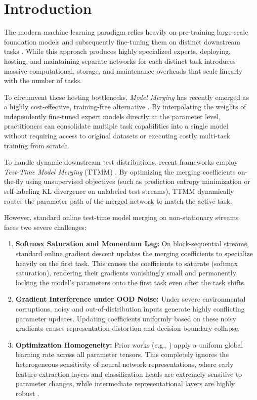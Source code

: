 \documentclass{article}
\theoremstyle{plain}
\theoremstyle{definition}
\theoremstyle{remark}
\begin{document}
\section{Introduction}
\label{submission_intro}
The modern machine learning paradigm relies heavily on pre-training large-scale foundation models and subsequently fine-tuning them on distinct downstream tasks \cite{resnet, wortsman_soups_2022}. While this approach produces highly specialized experts, deploying, hosting, and maintaining separate networks for each distinct task introduces massive computational, storage, and maintenance overheads that scale linearly with the number of tasks. 

To circumvent these hosting bottlenecks, \emph{Model Merging} has recently emerged as a highly cost-effective, training-free alternative \cite{ilharco23, dare_merging}. By interpolating the weights of independently fine-tuned expert models directly at the parameter level, practitioners can consolidate multiple task capabilities into a single model without requiring access to original datasets or executing costly multi-task training from scratch.

To handle dynamic downstream test distributions, recent frameworks employ \emph{Test-Time Model Merging} (TTMM) \cite{adamerging}. By optimizing the merging coefficients on-the-fly using unsupervised objectives (such as prediction entropy minimization or self-labeling KL divergence on unlabeled test streams), TTMM dynamically routes the parameter path of the merged network to match the active task.

However, standard online test-time model merging on non-stationary streams faces two severe challenges:
\begin{enumerate}
    \item \textbf{Softmax Saturation and Momentum Lag:} On block-sequential streams, standard online gradient descent updates the merging coefficients to specialize heavily on the first task. This causes the coefficients to saturate (softmax saturation), rendering their gradients vanishingly small and permanently locking the model's parameters onto the first task even after the task shifts.
    \item \textbf{Gradient Interference under OOD Noise:} Under severe environmental corruptions, noisy and out-of-distribution inputs generate highly conflicting parameter updates. Updating coefficients uniformly based on these noisy gradients causes representation distortion and decision-boundary collapse.
    \item \textbf{Optimization Homogeneity:} Prior works (e.g., \cite{adamerging, pc_merge}) apply a uniform global learning rate across all parameter tensors. This completely ignores the heterogeneous sensitivity of neural network representations, where early feature-extraction layers and classification heads are extremely sensitive to parameter changes, while intermediate representational layers are highly robust \cite{lfwa_merge}.
\end{enumerate}
\end{document}
